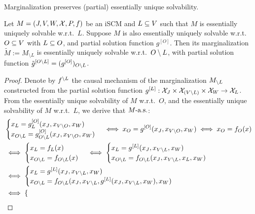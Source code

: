 Marginalization preserves (partial) essentially unique solvability.
\begin{Lem}\label{lem:marginalization_preserves_unique_solvability}
  Let $M = \left ( J, V, W, \mathcal{X}, P, f \right )$ be an iSCM and $L \subseteq V$ such that $M$ is essentially uniquely solvable w.r.t.\ $L$.
  Suppose $M$ is also essentially uniquely solvable w.r.t.\ $O \subseteq V$ with $L \subseteq O$, and partial solution function $g^{[O]}$. 
  Then its marginalization $\tilde M := M_{\setminus L}$ is essentially uniquely solvable w.r.t.\ $O \setminus L$, with partial solution function $\tilde{g}^{[O\setminus L]} = (g^{[O]})_{O\setminus L}$.
\end{Lem}
\begin{proof}
  Denote by $f^{\setminus L}$ the causal mechanism of the marginalization $M_{\setminus L}$ constructed from the partial solution function $g^{[L]} : \mathcal{X}_{J} \times \mathcal{X}_{(V \setminus L)} \times \mathcal{X}_{W} \to \mathcal{X}_L$.
  From the essentially unique solvability of $M$ w.r.t.\ $O$, and the essentially unique solvability of $M$ w.r.t.\ $L$, we derive that
  $M\text{-a.s.}$:
  \begin{equation*}\begin{split}
  & \begin{cases}
    x_L = g^{[O]}_L(x_J,x_{V\setminus O},x_W) \\
    x_{O\setminus L} = g^{[O]}_{O\setminus L}(x_J,x_{V\setminus O},x_W) 
  \end{cases}
  \iff x_O = g^{[O]}(x_J,x_{V\setminus O},x_W) 
  \iff x_O = f_O(x) \\
  & \iff \begin{cases}
    x_L = f_L(x) \\
    x_{O \setminus L} = f_{O \setminus L}(x) 
  \end{cases} 
  \iff \begin{cases}
    x_L = g^{[L]}(x_J,x_{V\setminus L},x_W) \\
    x_{O \setminus L} = f_{O \setminus L}(x_J,x_{V\setminus L},x_L,x_W) 
  \end{cases} \\
  & \iff \begin{cases}
    x_L = g^{[L]}(x_J,x_{V\setminus L},x_W) \\
    x_{O\setminus L} = f_{O \setminus L}(x_J,x_{V\setminus L},g^{[L]}(x_J,x_{V\setminus L},x_W),x_W) 
  \end{cases} \\
  & \iff \begin{cases}

\end{cases}
\end{split}
\end{equation*}
\end{proof}
